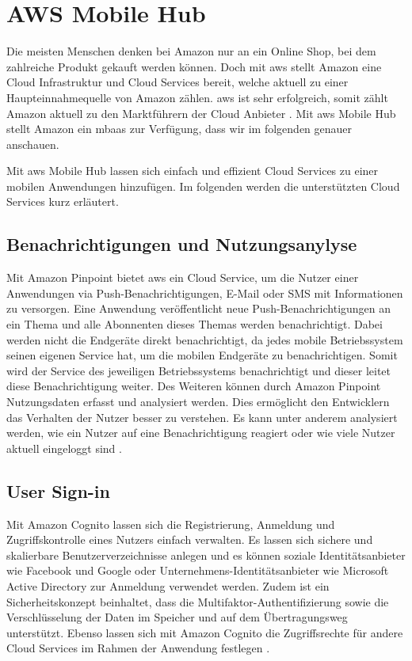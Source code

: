 \section{AWS Mobile Hub}
Die meisten Menschen denken bei Amazon nur an ein Online Shop, bei dem zahlreiche Produkt gekauft werden können. Doch mit \gls{aws} stellt Amazon eine Cloud Infrastruktur und Cloud Services bereit, welche aktuell zu einer Haupteinnahmequelle von Amazon zählen. \gls{aws} ist sehr erfolgreich, somit zählt Amazon aktuell zu den Marktführern der Cloud Anbieter \cite{statistacloudmarketshare}. Mit \gls{aws} Mobile Hub stellt Amazon ein \gls{mbaas} zur Verfügung, dass wir im folgenden genauer anschauen. \newline 

Mit \gls{aws} Mobile Hub lassen sich einfach und effizient Cloud Services zu einer mobilen Anwendungen hinzufügen. Im folgenden werden die unterstützten Cloud Services kurz erläutert.


\subsection{Benachrichtigungen und Nutzungsanylyse}
Mit Amazon Pinpoint bietet \gls{aws} ein Cloud Service, um die Nutzer einer Anwendungen via Push-Benachrichtigungen, E-Mail oder SMS mit Informationen zu versorgen. Eine Anwendung veröffentlicht neue Push-Benachrichtigungen an ein Thema und alle Abonnenten dieses Themas werden benachrichtigt. Dabei werden nicht die Endgeräte direkt benachrichtigt, da jedes mobile Betriebssystem seinen eigenen Service hat, um die mobilen Endgeräte zu benachrichtigen. Somit wird der Service des jeweiligen Betriebssystems benachrichtigt und dieser leitet diese Benachrichtigung weiter. Des Weiteren können durch Amazon Pinpoint Nutzungsdaten erfasst und analysiert werden. Dies ermöglicht den Entwicklern das Verhalten der Nutzer besser zu verstehen. Es kann unter anderem  analysiert werden, wie ein Nutzer auf eine Benachrichtigung reagiert oder wie viele Nutzer aktuell eingeloggt sind \cite{AmazonPinpoint}.

\subsection{User Sign-in}
Mit Amazon Cognito lassen sich die Registrierung, Anmeldung und Zugriffskontrolle eines Nutzers einfach verwalten. Es lassen sich sichere und skalierbare Benutzerverzeichnisse anlegen und es können soziale Identitätsanbieter wie Facebook und Google oder Unternehmens-Identitätsanbieter wie Microsoft Active Directory zur Anmeldung verwendet werden. Zudem ist ein Sicherheitskonzept beinhaltet, dass die Multifaktor-Authentifizierung sowie die Verschlüsselung der Daten im Speicher und auf dem Übertragungsweg unterstützt. Ebenso lassen sich mit Amazon Cognito die Zugriffsrechte für andere Cloud Services im Rahmen der Anwendung festlegen \cite{AmazonCognito}.

